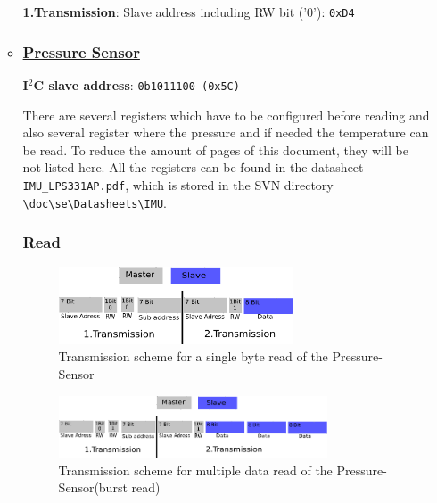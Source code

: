 \begin{itemize}
\begin{itemize}
\textbf{1.Transmission}: Slave address including RW bit ('0'): \texttt{0xD4}

\item \subsubsection*{\underline{\textbf{Pressure Sensor}}}
\label{sec:hardware:Components:Adressing:IMU:Pressure}

\textbf{I$^2$C slave address}: \texttt{0b1011100 (0x5C)}

There are several registers which have to be configured before reading and also several register where the pressure and if needed the temperature can be read. To reduce the amount of pages of this document, they will be not listed here. All the registers can be found in the datasheet \texttt{IMU\_LPS331AP.pdf}, which is stored in the SVN directory \texttt{\textbackslash{}doc\textbackslash{}se\textbackslash{}Datasheets\textbackslash{}IMU}.

\subsubsection{Read}
\label{subsubsec:Pressureread}

\begin{figure}[H]
	\centering\includegraphics[width=0.7\textwidth]{fig/I2C_Adressing/ACC_read_single}
	\caption[Scheme for a single byte read of the Pressure-Sensor]{Transmission scheme for a single byte read of the Pressure-Sensor}
	\label{fig:Pressure1}
\end{figure}

\begin{figure}[H]
	\centering\includegraphics[width=0.80\textwidth]{fig/I2C_Adressing/ACC_read_multiple}
	\caption[Scheme for multiple data read of the Pressure-Sensor]{Transmission scheme for multiple data read of the Pressure-Sensor(burst read)}
	\label{fig:Pressure2}
\end{figure}


\end{itemize}
\end{itemize}
